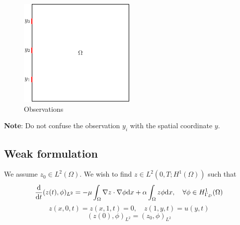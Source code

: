 \documentclass[12pt]{article}
\begin{document}
\begin{figure}
\begin{center}
\includegraphics[width=0.5\textwidth]{heat2d_obs}
\caption{Observations}
\end{center}
\end{figure}
\noindent
{\bf Note}: Do not confuse the observation $y_i$ with the spatial coordinate $y$.
\subsection{Weak formulation}
We assume $z_0 \in L^2(\Omega)$. We wish to find $z \in L^2(0,T;H^1(\Omega))$ such that
\[
 \frac{\textrm{d} }{\textrm{d} t}(z(t), \phi)_{L^2} = - \mu \int_\Omega \nabla z \cdot \nabla \phi \textrm{d} x +  \alpha \int_\Omega z \phi \textrm{d} x, \quad \forall \phi \in H^1_{\Gamma_D}(\Omega)
\]
\[
z(x,0,t) = z(x,1,t) = 0, \quad z(1,y,t) = u(y,t)
\]
\[
 (z(0),\phi)_{L^2} = (z_0 ,\phi)_{L^2}
\]
\end{document}
